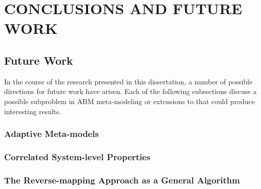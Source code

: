 \chapter{CONCLUSIONS AND FUTURE WORK}
\thispagestyle{plain}

\label{Conclusions}









\section{Future Work}

In the course of the research presented in this dissertation, a number of possible directions for future work have arisen.
Each of the following subsections discuss a possible subproblem in ABM meta-modeling or extensions to \fw that could produce interesting results.

\subsection{Adaptive Meta-models}


\subsection{Correlated System-level Properties}


\subsection{The Reverse-mapping Approach as a General Algorithm}


